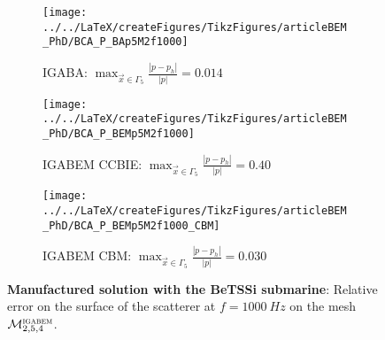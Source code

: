 \begin{figure}
	\centering
	\begin{subfigure}[t]{\textwidth}
		\texttt{[image: ../../LaTeX/createFigures/TikzFigures/articleBEM\_PhD/BCA\_P\_BAp5M2f1000]}
		\caption{IGABA: $\displaystyle \max_{\vec{x}\in\Gamma_5}\frac{|p-p_h|}{|p|} = 0.014$}
		\label{Fig3:BCA_P_p5M2f1000_BA}
	\end{subfigure} 
	\par\bigskip
	\begin{subfigure}[t]{\textwidth}
		\texttt{[image: ../../LaTeX/createFigures/TikzFigures/articleBEM\_PhD/BCA\_P\_BEMp5M2f1000]}
		\caption{IGABEM CCBIE: $\displaystyle \max_{\vec{x}\in\Gamma_5}\frac{|p-p_h|}{|p|} = 0.40$}
	\end{subfigure} 
	\par\bigskip
	\begin{subfigure}[t]{\textwidth}
		\texttt{[image: ../../LaTeX/createFigures/TikzFigures/articleBEM\_PhD/BCA\_P\_BEMp5M2f1000\_CBM]}
		\caption{IGABEM CBM: $\displaystyle \max_{\vec{x}\in\Gamma_5}\frac{|p-p_h|}{|p|} = 0.030$}
	\end{subfigure} 
	\caption{\textbf{Manufactured solution with the BeTSSi submarine}: Relative error on the surface of the scatterer at $f=\SI{1000}{Hz}$ on the mesh ${\cal M}_{2,5,4}^{\textsc{igabem}}$.}
	\label{Fig3:BCA_P_p5M2f1000}
\end{figure}

